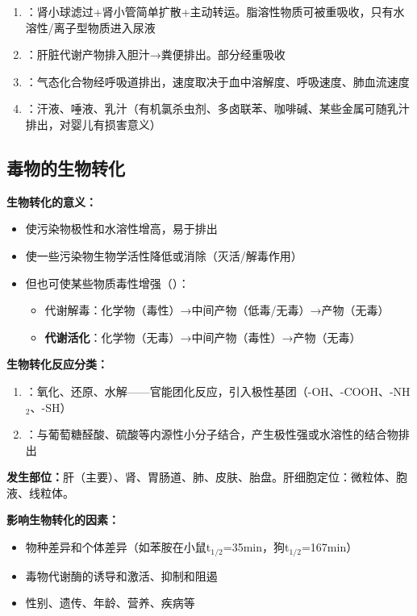 \begin{enumerate}[leftmargin=*]
    \item {}：肾小球滤过+肾小管简单扩散+主动转运。脂溶性物质可被重吸收，只有水溶性/离子型物质进入尿液
    \item {}：肝脏代谢产物排入胆汁→粪便排出。部分经重吸收
    \item {}：气态化合物经呼吸道排出，速度取决于血中溶解度、呼吸速度、肺血流速度
    \item {}：汗液、唾液、乳汁（有机氯杀虫剂、多卤联苯、咖啡碱、某些金属可随乳汁排出，对婴儿有损害意义）
\end{enumerate}

\subsection{毒物的生物转化}

\begin{keybox}
\textbf{生物转化的意义：}
\begin{itemize}[leftmargin=*]
    \item 使污染物极性和水溶性增高，易于排出
    \item 使一些污染物生物学活性降低或消除（灭活/解毒作用）
    \item 但也可使某些物质毒性增强（）：
    \begin{itemize}
        \item 代谢解毒：化学物（毒性）→中间产物（低毒/无毒）→产物（无毒）
        \item \textbf{代谢活化}：化学物（无毒）→中间产物（毒性）→产物（无毒）
    \end{itemize}
\end{itemize}

\textbf{生物转化反应分类：}
\begin{enumerate}[leftmargin=*]
    \item {}：氧化、还原、水解——官能团化反应，引入极性基团（-OH、-COOH、-NH$_2$、-SH）
    \item {}：与葡萄糖醛酸、硫酸等内源性小分子结合，产生极性强或水溶性的结合物排出
\end{enumerate}

\textbf{发生部位：}肝（主要）、肾、胃肠道、肺、皮肤、胎盘。肝细胞定位：微粒体、胞液、线粒体。

\textbf{影响生物转化的因素：}
\begin{itemize}[leftmargin=*]
    \item 物种差异和个体差异（如苯胺在小鼠t$_{1/2}$=35min，狗t$_{1/2}$=167min）
    \item 毒物代谢酶的诱导和激活、抑制和阻遏
    \item 性别、遗传、年龄、营养、疾病等
\end{itemize}
\end{keybox}

